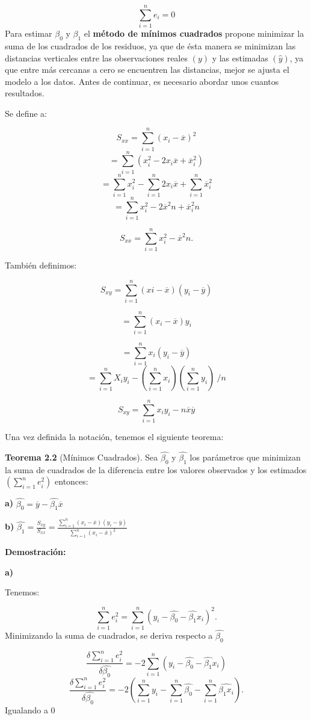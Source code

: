 \documentclass[
  a4paper,
  oneside,
  openany]{book}
\begin{document}
\[\sum_{i=1}^{n}e_{i}=0\]
Para estimar \(\beta_{0}\) y \(\beta_{1}\) el \textbf{método de mínimos cuadrados} propone minimizar la suma de los cuadrados de los residuos, ya que de ésta manera se minimizan las distancias verticales entre las observaciones reales \((y)\) y las estimadas \((\hat{y})\), ya que entre más cercanas a cero se encuentren las distancias, mejor se ajusta el modelo a los datos.
Antes de continuar, es necesario abordar unos cuantos resultados.

Se define a:

\[S_{xx}=\sum_{i=1}^{n}(x_{i}-\overline{x})^{2}\]
\[=\sum_{i=1}^{n}(x_{i}^2-2x_{i}\overline{x}+\overline{x}_{i}^{2})\]
\[=\sum_{i=1}^{n}x_{i}^{2}-\sum_{i=1}^{n}2x_{i}\overline{x}+\sum_{i=1}^{n}\overline{x}_{i}^2\]
\[=\sum_{i=1}^{n}x_{i}^2-2\overline{x}^2n+\overline{x}_{i}^2n\]

\[S_{xx}=\sum_{i=1}^{n}x_{i}^2-\overline{x}^2n.\]

También definimos:

\[S_{xy}=\sum_{i=1}^{n}(xi-\overline{x})(y_{i}-\overline{y})\]

\[=\sum_{i=1}^{n}(x_{i}-\overline{x})y_{i}\]

\[=\sum_{i=1}^{n}x_{i}(y_{i}-\overline{y})\]
\[=\sum_{i=1}^{n}X_{i}y_{i}-\left(\sum_{i=1}^{n}x_{i}\right) \left(\sum_{i=1}^{n}y_{i}\right) \ /{n}\]

\[S_{xy}=\sum_{i=1}^{n}x_{i}y_{i}-n\overline{x}\overline{y}\]

Una vez definida la notación, tenemos el siguiente teorema:

\textbf{Teorema 2.2} (Mínimos Cuadrados). Sea \(\hat{\beta_0}\) y \(\hat{\beta_{1}}\) los parámetros que minimizan la suma de cuadrados de la diferencia entre los valores observados y los estimados \(\left(\sum_{i=1}^{n}e_i^2\right)\) entonces:

\textbf{a)} \(\hat{\beta_{0}}=\overline{y}-\hat{\beta_{1}}\overline{x}\)

\textbf{b)} \(\hat{\beta_{1}}=\frac{S_{xy}}{S_{xx}}=\frac{\sum_{i=1}^{n}(x_{i}-\overline{x})(y_{i}-\overline{y})}{\sum_{i=1}^{n}(x_{i}-\overline{x})^2}\)

\textbf{Demostración:}

\textbf{a)}

Tenemos:

\[\sum_{i=1}^{n}e_{i}^2=\sum_{i=1}^{n}(y_{i}-\hat{\beta_{0}}-\hat{\beta_{1}}x_{i})^2.\]
Minimizando la suma de cuadrados, se deriva respecto a \(\hat{\beta_{0}}\)

\[\frac{\delta\sum_{i=1}^{n}e_{i}^2}{\delta\hat{\beta_{0}}}=-2\sum_{i=1}^{n}(y_{i}-\hat{\beta_{0}}-\hat{\beta_{1}}x_{i})\]
\[\frac{\delta\sum_{i=1}^{n}e_{i}^2}{\delta\hat{\beta_{0}}}=-2\left(\sum_{i=1}^{n}y_{i}-\sum_{i=1}^{n}\hat{\beta_{0}}-\sum_{i=1}^{n}\hat{\beta_{1}x_{i}}\right).\]
Igualando a 0
\end{document}
